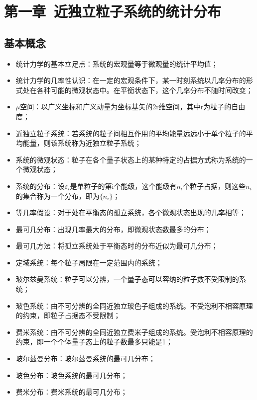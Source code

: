 \documentclass[UTF8,twocolumn]{ctexart}
\date{}
\providecommand{\tightlist}{%
  \setlength{\itemsep}{0pt}\setlength{\parskip}{0pt}}
\begin{document}
\section{第一章\ 近独立粒子系统的统计分布}\label{ux7b2cux4e00ux7ae0-ux8fd1ux72ecux7acbux7c92ux5b50ux7cfbux7edfux7684ux7edfux8ba1ux5206ux5e03}

\subsection{基本概念}\label{ux57faux672cux6982ux5ff5}

\begin{itemize}
\tightlist
\item
  统计力学的基本立足点：系统的宏观量等于微观量的统计平均值；
\item
  统计力学的几率性认识：在一定的宏观条件下，某一时刻系统以几率分布的形式处在各种可能的微观状态中。在平衡状态下，这个几率分布不随时间改变；
\item
  \(\mu\)空间：以广义坐标和广义动量为坐标基矢的2r维空间，其中r为粒子的自由度；
\item
  近独立粒子系统：若系统的粒子间相互作用的平均能量远远小于单个粒子的平均能量，则该系统称为近独立粒子系统；
\item
  系统的微观状态：粒子在各个量子状态上的某种特定的占据方式称为系统的一个微观状态；
\item
  系统的分布：设\(\varepsilon_i\)是单粒子的第i个能级，这个能级有\(n_i\)个粒子占据，则这些\(n_i\)的集合称为一个分布，即为\(\{n_i\}\)；
\item
  等几率假设：对于处在平衡态的孤立系统，各个微观状态出现的几率相等；
\item
  最可几分布：出现几率最大的分布，即微观状态数最多的分布；
\item
  最可几方法：将孤立系统处于平衡态时的分布近似为最可几分布；
\item
  定域系统：每个粒子局限在一定范围内的系统；
\item
  玻尔兹曼系统：粒子可以分辨，一个量子态可以容纳的粒子数不受限制的系统；
\item
  玻色系统：由不可分辨的全同近独立玻色子组成的系统。不受泡利不相容原理的约束，即粒子占据态不受限制；
\item
  费米系统：由不可分辨的全同近独立费米子组成的系统。受泡利不相容原理的约束，即一个个体量子态上的粒子数最多只能是1；
\item
  玻尔兹曼分布：玻尔兹曼系统的最可几分布；
\item
  玻色分布：玻色系统的最可几分布；
\item
  费米分布：费米系统的最可几分布；
\end{itemize}
\end{document}
